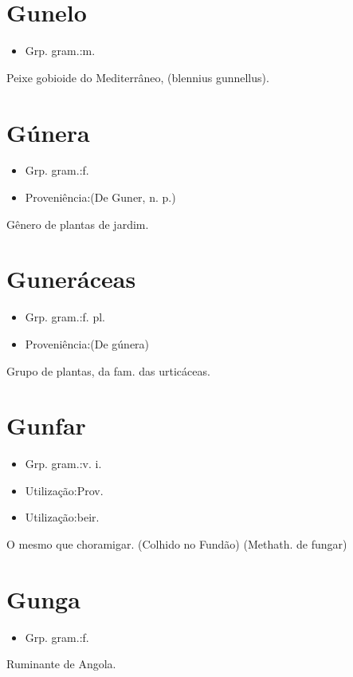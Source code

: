 \section{Gunelo}
\begin{itemize}
\item {Grp. gram.:m.}
\end{itemize}
Peixe gobioide do Mediterrâneo, (\textunderscore blennius gunnellus\textunderscore ).
\section{Gúnera}
\begin{itemize}
\item {Grp. gram.:f.}
\end{itemize}
\begin{itemize}
\item {Proveniência:(De \textunderscore Guner\textunderscore , n. p.)}
\end{itemize}
Gênero de plantas de jardim.
\section{Guneráceas}
\begin{itemize}
\item {Grp. gram.:f. pl.}
\end{itemize}
\begin{itemize}
\item {Proveniência:(De \textunderscore gúnera\textunderscore )}
\end{itemize}
Grupo de plantas, da fam. das urticáceas.
\section{Gunfar}
\begin{itemize}
\item {Grp. gram.:v. i.}
\end{itemize}
\begin{itemize}
\item {Utilização:Prov.}
\end{itemize}
\begin{itemize}
\item {Utilização:beir.}
\end{itemize}
O mesmo que \textunderscore choramigar\textunderscore . (Colhido no Fundão)
(Methath. de \textunderscore fungar\textunderscore )
\section{Gunga}
\begin{itemize}
\item {Grp. gram.:f.}
\end{itemize}
Ruminante de Angola.
